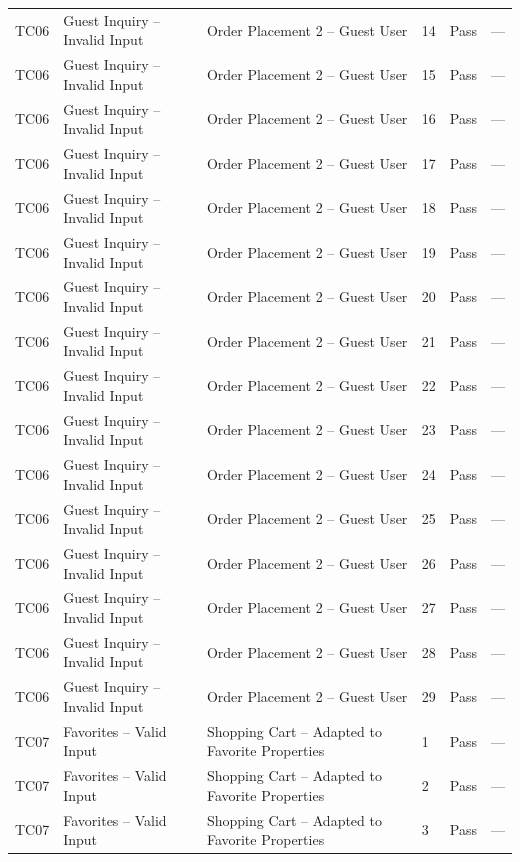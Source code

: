 {\begin{longtable}{@{}p{1.2cm} p{4.2cm} p{4.4cm} p{0.8cm} p{0.9cm} p{1.6cm}@{}}
  TC06 & Guest Inquiry -- Invalid Input & Order Placement 2 -- Guest User & 14 & Pass & --- \\
  TC06 & Guest Inquiry -- Invalid Input & Order Placement 2 -- Guest User & 15 & Pass & --- \\
  TC06 & Guest Inquiry -- Invalid Input & Order Placement 2 -- Guest User & 16 & Pass & --- \\
  TC06 & Guest Inquiry -- Invalid Input & Order Placement 2 -- Guest User & 17 & Pass & --- \\
  TC06 & Guest Inquiry -- Invalid Input & Order Placement 2 -- Guest User & 18 & Pass & --- \\
  TC06 & Guest Inquiry -- Invalid Input & Order Placement 2 -- Guest User & 19 & Pass & --- \\
  TC06 & Guest Inquiry -- Invalid Input & Order Placement 2 -- Guest User & 20 & Pass & --- \\
  TC06 & Guest Inquiry -- Invalid Input & Order Placement 2 -- Guest User & 21 & Pass & --- \\
  TC06 & Guest Inquiry -- Invalid Input & Order Placement 2 -- Guest User & 22 & Pass & --- \\
  TC06 & Guest Inquiry -- Invalid Input & Order Placement 2 -- Guest User & 23 & Pass & --- \\
  TC06 & Guest Inquiry -- Invalid Input & Order Placement 2 -- Guest User & 24 & Pass & --- \\
  TC06 & Guest Inquiry -- Invalid Input & Order Placement 2 -- Guest User & 25 & Pass & --- \\
  TC06 & Guest Inquiry -- Invalid Input & Order Placement 2 -- Guest User & 26 & Pass & --- \\
  TC06 & Guest Inquiry -- Invalid Input & Order Placement 2 -- Guest User & 27 & Pass & --- \\
  TC06 & Guest Inquiry -- Invalid Input & Order Placement 2 -- Guest User & 28 & Pass & --- \\
  TC06 & Guest Inquiry -- Invalid Input & Order Placement 2 -- Guest User & 29 & Pass & --- \\
  \midrule
  TC07 & Favorites -- Valid Input & Shopping Cart -- Adapted to Favorite Properties & 1 & Pass & --- \\
  TC07 & Favorites -- Valid Input & Shopping Cart -- Adapted to Favorite Properties & 2 & Pass & --- \\
  TC07 & Favorites -- Valid Input & Shopping Cart -- Adapted to Favorite Properties & 3 & Pass & --- \\

\end{longtable}}
